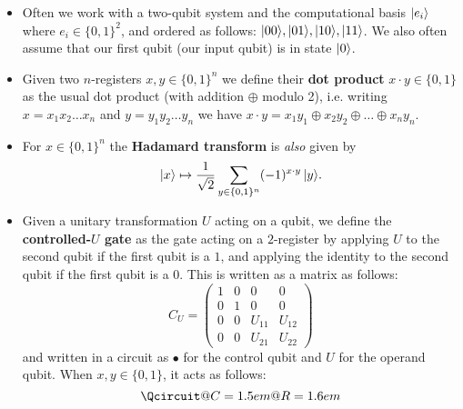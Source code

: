 \documentclass[10pt]{article}
\DeclarePairedDelimiter\ket{\lvert}{\rangle}
\begin{document}
                \begin{itemize}
                    \item Often we work with a two-qubit system and the computational basis $\ket{e_i}$ where \mbox{$e_i\in\{0,1\}^2$}, and ordered as follows: $\ket{00},\ket{01},\ket{10},\ket{11}$.
                        We also often assume that our first qubit (our input qubit) is in state $\ket{0}$.
                    \item Given two $n$-registers $x,y\in\{0,1\}^n$ we define their \textbf{dot product} $x\cdot y\in\{0,1\}$ as the usual dot product (with addition $\oplus$ modulo 2), i.e. writing $x=x_1x_2\ldots x_n$ and $y=y_1y_2\ldots y_n$ we have $x\cdot y={x_1y_1}\oplus{x_2y_2}\oplus\ldots\oplus{x_ny_n}$.
                    \item For $x\in\{0,1\}^n$ the \textbf{Hadamard transform} is \emph{also} given by
                        \begin{equation*}
                            \ket{x} \mapsto \frac{1}{\sqrt{2}}\sum_{y\in\{0,1\}^n}(-1)^{x\cdot y}\,\ket{y}.
                        \end{equation*}
                    \item Given a unitary transformation $U$ acting on a qubit, we define the \textbf{controlled-$U$ gate} as the gate acting on a $2$-register by applying $U$ to the second qubit if the first qubit is a $1$, and applying the identity to the second qubit if the first qubit is a $0$.
                        This is written as a matrix as follows:
                        \begin{equation*}
                            C_{U}=\left(
                            \begin{array}{cccc}
                                1&0&0&0\\
                                0&1&0&0\\
                                0&0&U_{11}&U_{12}\\
                                0&0&U_{21}&U_{22}
                            \end{array}
                            \right)
                        \end{equation*}
                        and written in a circuit as $\bullet$ for the control qubit and $U$ for the operand qubit.
                        When $x,y\in\{0,1\}$, it acts as follows:
                        \begin{equation*}
                            \Qcircuit @C=1.5em @R=1.6em {
}
\end{equation*}
\end{itemize}
\end{document}
